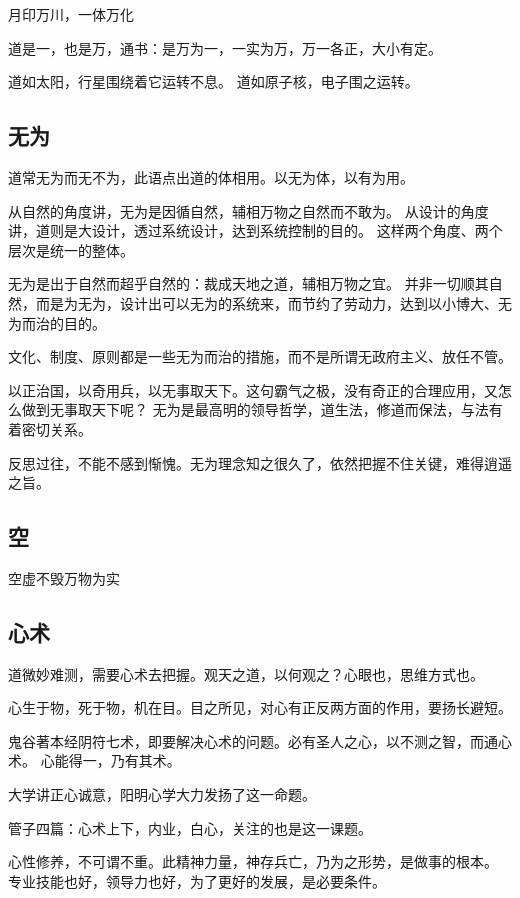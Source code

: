 月印万川，一体万化

道是一，也是万，通书：是万为一，一实为万，万一各正，大小有定。

道如太阳，行星围绕着它运转不息。
道如原子核，电子围之运转。

\subsection{无为}

道常无为而无不为，此语点出道的体相用。以无为体，以有为用。

从自然的角度讲，无为是因循自然，辅相万物之自然而不敢为。
从设计的角度讲，道则是大设计，透过系统设计，达到系统控制的目的。
这样两个角度、两个层次是统一的整体。

无为是出于自然而超乎自然的：裁成天地之道，辅相万物之宜。
并非一切顺其自然，而是为无为，设计出可以无为的系统来，而节约了劳动力，达到以小博大、无为而治的目的。

文化、制度、原则都是一些无为而治的措施，而不是所谓无政府主义、放任不管。

以正治国，以奇用兵，以无事取天下。这句霸气之极，没有奇正的合理应用，又怎么做到无事取天下呢？
无为是最高明的领导哲学，道生法，修道而保法，与法有着密切关系。

反思过往，不能不感到惭愧。无为理念知之很久了，依然把握不住关键，难得逍遥之旨。

\subsection{空}

空虚不毁万物为实

\subsection{心术}

道微妙难测，需要心术去把握。观天之道，以何观之？心眼也，思维方式也。

心生于物，死于物，机在目。目之所见，对心有正反两方面的作用，要扬长避短。

鬼谷著本经阴符七术，即要解决心术的问题。必有圣人之心，以不测之智，而通心术。
心能得一，乃有其术。

大学讲正心诚意，阳明心学大力发扬了这一命题。

管子四篇：心术上下，内业，白心，关注的也是这一课题。

心性修养，不可谓不重。此精神力量，神存兵亡，乃为之形势，是做事的根本。
专业技能也好，领导力也好，为了更好的发展，是必要条件。

